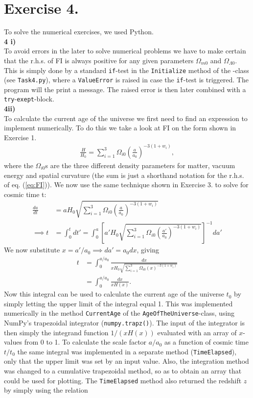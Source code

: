 \documentclass{emulateapj}
\begin{document}
	 \section*{Exercise 4.}
	 To solve the numerical exercises, we used Python. \\
	 \textbf{4 i)}\\
	 To avoid errors in the later to solve numerical problems we have to make certain that the r.h.s. of FI is always positive for any given parameters $\Omega_{m 0}$ and $\Omega_{\Lambda 0}$. This is simply done by a standard \texttt{if}-test in the \texttt{Initialize} method of the -class (see \texttt{Task4.py}), where a \texttt{ValueError} is raised in case the \texttt{if}-test is triggered. The program will the print a message. The raised error is then later combined with a \texttt{try}-\texttt{exept}-block.\\
	 \textbf{4ii)}\\
	 To calculate the current age of the universe we first need to find an expression to implement numerically. To do this we take a look at FI on the form shown in Exercise 1. 
	 \begin{align}
	 	\frac{H}{H_0} = \sum_{i=1}^{3}\Omega_{i0}\left(\frac{a}{a_0}\right)^{-3(1+w_i)},
	 \end{align}
	 where the $\Omega_{i0}$s are the three different density parameters for matter, vacuum energy and spatial curvature (the sum is just a shorthand notation for the r.h.s. of eq. (\ref{eq:FI})). We now use the same technique shown in Exercise 3. to solve for cosmic time t:
	 \begin{align}
	 	\frac{da}{dt} &= a H_0\sqrt{\sum_{i=1}^{3}\Omega_{i0}\left(\frac{a}{a_0}\right)^{-3(1+w_i)}}\\
	 	\implies t&=  \int_{0}^{t}dt' = \int_{0}^{a}\left[a'H_0\sqrt{\sum_{i=1}^{3}\Omega_{i0}\left(\frac{a'}{a_0}\right)^{-3(1+w_i)}}\right]^{-1}da'
	 \end{align}
	 We now substitute $x = a'/a_0\implies da' = a_0 dx$, giving
	 \begin{align}
		 t &= \int_{0}^{a/a_0}\frac{dx}{xH_0\sqrt{\sum_{i=1}^{3}\Omega_{i0}\left(x\right)^{-3(1+w_i)}}}\\
	 	& = \int_{0}^{a/a_0}\frac{dx}{xH(x)}.
	 \end{align}
	 Now this integral can be used to calculate the current age of the universe $t_0$ by simply letting the upper limit of the integral equal 1. This was implemented numerically in the method \texttt{CurrentAge} of the \texttt{AgeOfTheUniverse}-class, using NumPy's trapezoidal integrator (\texttt{numpy.trapz()}). The input of the integrator is then simply the integrand function $1/(xH(x))$ evaluated with an array of $x$-values from 0 to 1. To calculate the scale factor $a/a_0$ as a function of cosmic time $t/t_0$ the same integral was implemented in a separate method (\texttt{TimeElapsed}), only that the upper limit was set by an input value. Also, the integration method was changed to a cumulative trapezoidal method, so as to obtain an array that could be used for plotting. The \texttt{TimeElapsed} method also returned the redshift $z$ by simply using the relation 
\end{document}
